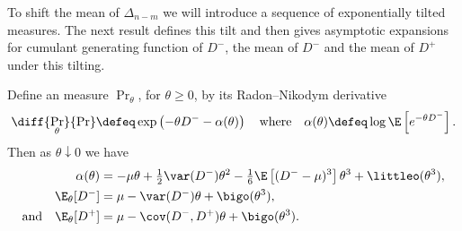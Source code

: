 To shift the mean of $\Delta_{n-m}$ we will introduce a sequence of exponentially tilted measures. The next result defines this tilt and then gives asymptotic expansions for cumulant generating function of $D^-$, the mean of $D^-$ and the mean of $D^+$ under this tilting. 
\begin{lemma}
    \label{lem:asym-expansions}
    Define an measure $\Pr_{\theta}$, for $\theta \geq 0$, by its Radon--Nikodym derivative
    \begin{equation*}
        \diff{\Pr_{\theta}}{\Pr} \defeq \exp\left( - \theta D^- - \alpha(\theta) \right)
        \quad \text{where} \quad
        \alpha(\theta) \defeq \log \E \left[ e^{-\theta D^-} \right].
    \end{equation*}
    Then as $\theta \downarrow 0$ we have
    \begin{align*}
        \alpha(\theta) &= -\mu \theta + \tfrac{1}{2}\var(D^-) \theta^2 - \tfrac{1}{6} \E \left[ (D^- - \mu)^3 \right] \theta^3 + \littleo(\theta^3), \\
        \E_{\theta}[D^-] &= \mu - \var(D^-) \theta + \bigo(\theta^3), \\
        \text{and} \quad \E_{\theta}[D^+] &= \mu - \cov(D^-, D^+) \theta + \bigo(\theta^3).
    \end{align*}
\end{lemma}
